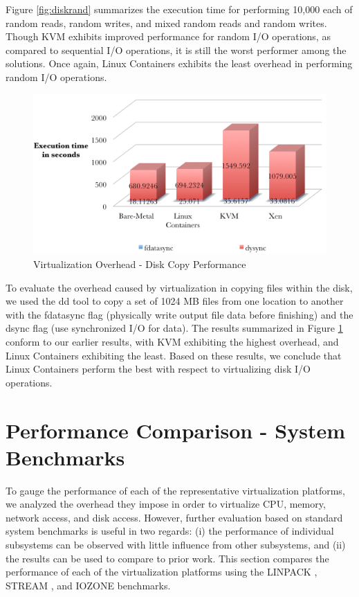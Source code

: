 Figure \ref{fig:diskrand} summarizes the execution time for performing 10,000 each of random reads, random writes, and mixed random reads and random writes. Though KVM exhibits improved performance for random I/O operations, as compared to sequential I/O operations, it is still the worst performer among the solutions. Once again, Linux Containers exhibits the least overhead in performing random I/O operations.

\begin{figure}[H]
\centering
\includegraphics[width=130mm]{diskcopy.png}
\caption{Virtualization Overhead - Disk Copy Performance}
\label{fig:diskcopy}
\end{figure}

To evaluate the overhead caused by virtualization in copying files within the disk, we used the dd tool to copy a set of 1024 MB files from one location to another with the fdatasync flag (physically write output file data before finishing) and the dsync flag (use synchronized I/O for data). The results summarized in  Figure \ref{fig:diskcopy} conform to our earlier results, with KVM exhibiting the highest overhead, and Linux Containers exhibiting the least. Based on these results, we conclude that Linux Containers perform the best with respect to virtualizing disk I/O operations.   

\section{Performance Comparison - System Benchmarks}

To gauge the performance of each of the representative virtualization platforms, we analyzed the overhead they impose in order to virtualize CPU, memory, network access, and disk access. However, further evaluation based on standard system benchmarks is useful in two regards: (i) the performance of individual subsystems can be observed with little influence from other subsystems, and (ii) the results can be used to compare to prior work. This section compares the performance of each of the virtualization platforms using the LINPACK \cite{linpack}, STREAM \cite{stream}, and IOZONE \cite{iozone} benchmarks.

